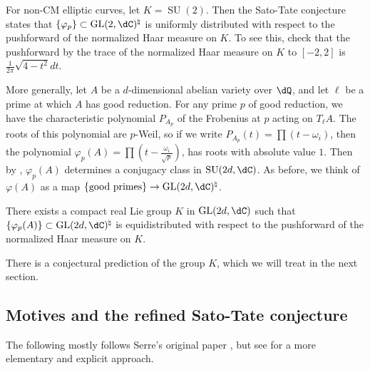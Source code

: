 For non-CM elliptic curves, let $K=\operatorname{SU}(2)$. Then the Sato-Tate 
conjecture states that $\{\varphi_p\}\subset \gl{2}{\dC}^\natural$ is 
uniformly distributed with respect to the pushforward of the normalized Haar 
measure on $K$. To see this, check that the pushforward by the trace of the 
normalized Haar measure on $K$ to $[-2,2]$ is $\frac{1}{2\pi} \sqrt{4-t^2} dt$. 

More generally, let $A$ be a $d$-dimensional abelian variety over $\dQ$, and 
let $\ell$ be a prime at which $A$ has good reduction. For any prime $p$ of 
good reduction, we have the characteristic polynomial $P_{A_p}$ of the 
Frobenius at $p$ acting on $T_\ell A$. The roots of this polynomial are 
$p$-Weil, so if we write $P_{A_p}(t) = \prod (t-\omega_i)$, then the polynomial 
$\varphi_p(A) = \prod \left(t-\frac{\omega_i}{\sqrt p}\right)$, has roots with 
absolute value $1$. Then by \cite[13.1]{ka88}, $\varphi_p(A)$ determines a 
conjugacy class in $\operatorname{SU}(2 d,\dC)$. As before, we think of 
$\varphi(A)$ as a map 
$\{\text{good primes}\}\to \operatorname{GL}(2 d,\dC)^\natural$. 

\begin{conjecture}[Serre]
There exists a compact real Lie group $K$ in $\gl{2d}{\dC}$ such 
that $\{\varphi_p(A)\}\subset \gl{2d}{\dC}^\natural$ is equidistributed with 
respect to the pushforward of the normalized Haar measure on $K$. 
\end{conjecture}

There is a conjectural prediction of the group $K$, which we will treat in the 
next section. 





\subsection{Motives and the refined Sato-Tate conjecture}

The following mostly follows Serre's original paper \cite{se94}, but see 
\cite{se12} for a more elementary and explicit approach. 

